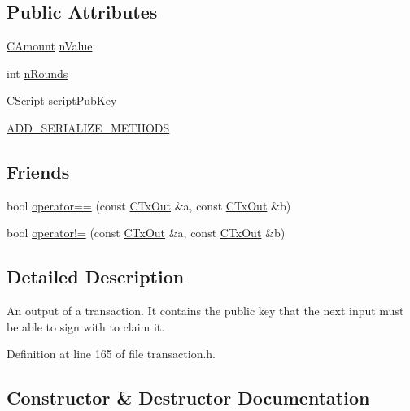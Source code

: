 \subsection*{Public Attributes}
\begin{DoxyCompactItemize}
\item 
\hyperlink{amount_8h_a4eaf3a5239714d8c45b851527f7cb564}{C\+Amount} \hyperlink{class_c_tx_out_ab278ecef3817a972cb6bc5360d13f197}{n\+Value}
\item 
int \hyperlink{class_c_tx_out_aeac97244e392de9dad0c0d0dd0184d1e}{n\+Rounds}
\item 
\hyperlink{class_c_script}{C\+Script} \hyperlink{class_c_tx_out_a25bf3f2f4befb22a6a0be45784fe57e2}{script\+Pub\+Key}
\item 
\hyperlink{class_c_tx_out_add758078b21ec1004fe8144fcee44890}{A\+D\+D\+\_\+\+S\+E\+R\+I\+A\+L\+I\+Z\+E\+\_\+\+M\+E\+T\+H\+O\+D\+S}
\end{DoxyCompactItemize}
\subsection*{Friends}
\begin{DoxyCompactItemize}
\item 
bool \hyperlink{class_c_tx_out_a7ae3396bfd80108be89eaa97573eb1bb}{operator==} (const \hyperlink{class_c_tx_out}{C\+Tx\+Out} \&a, const \hyperlink{class_c_tx_out}{C\+Tx\+Out} \&b)
\item 
bool \hyperlink{class_c_tx_out_a9657dc95dd3ba8b612baf7a5dd9b2e02}{operator!=} (const \hyperlink{class_c_tx_out}{C\+Tx\+Out} \&a, const \hyperlink{class_c_tx_out}{C\+Tx\+Out} \&b)
\end{DoxyCompactItemize}


\subsection{Detailed Description}
An output of a transaction. It contains the public key that the next input must be able to sign with to claim it. 

Definition at line 165 of file transaction.\+h.



\subsection{Constructor \& Destructor Documentation}
\hypertarget{class_c_tx_out_a46110a759b21c75968297768f759be59}{}
